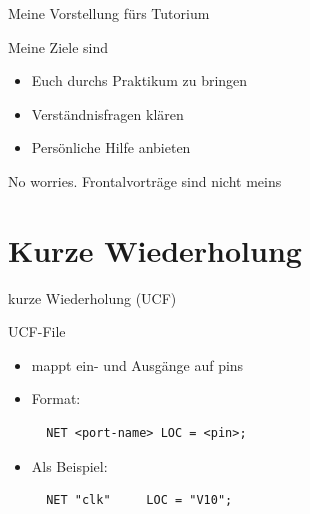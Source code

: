   \begin{frame} {Meine Vorstellung fürs Tutorium}
    \begin{block} {Meine Ziele sind}
      \begin{itemize}
        \item Euch durchs Praktikum zu bringen
        \item Verständnisfragen klären
        \item Persönliche Hilfe anbieten
      \end{itemize}
    \end{block}
    \begin{exampleblock} {No worries.}
      Frontalvorträge sind nicht meins
    \end{exampleblock}
  \end{frame}





  \section{Kurze Wiederholung}
  \begin{frame} [fragile] {kurze Wiederholung (UCF)}
    \begin{block} {UCF-File}
      \begin{itemize}
        \item mappt ein- und Ausgänge auf pins
        \item Format:
        \begin{lstlisting}
  NET <port-name> LOC = <pin>;
        \end{lstlisting}
        \item Als Beispiel:
        \begin{lstlisting}
  NET "clk"		LOC = "V10";
        \end{lstlisting}
      \end{itemize}
    \end{block}
  \end{frame}

